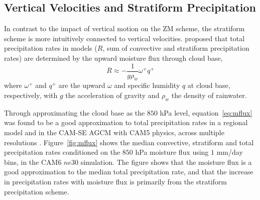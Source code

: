 \documentclass[times]{qjrms4}
\begin{document}
\subsection{Vertical Velocities and Stratiform Precipitation}

In contrast to the impact of vertical motion on the ZM scheme, the stratiform scheme is more intuitively connected to vertical velocities. \cite{RETAL2016CD} proposed that total precipitation rates in models ($R$, sum of convective and stratiform precipitation rates) are determined by the upward moisture flux through cloud base,
\begin{equation}
R \approx -\frac{1}{g\rho_{w}} \omega^+ q^+ \label{eq:mflux}
\end{equation}
where $\omega^+$ and $q^+$ are the upward $\omega$ and specific humidity $q$ at cloud base, respectively, with $g$ the acceleration of gravity and $\rho_w$ the density of rainwater. 

Through approximating the cloud base as the $850$ hPa level, equation~\ref{eq:mflux} was found to be a good approximation to total precipitation rates in a regional model \citep{RETAL2016CD} and in the CAM-SE AGCM with CAM5 physics, across multiple resolutions \citep{OETAL2016JAMES}. Figure~\ref{fig:mflux} shows the median convective, stratiform and total precipitation rates conditioned on the $850$ hPa moisture flux using $1$ mm/day bins, in the CAM6 $ne30$ simulation. The figure shows that the moisture flux is a good approximation to the median total precipitation rate, and that the increase in precipitation rates with moisture flux is primarily from the stratiform precipitation scheme. 
\end{document}

